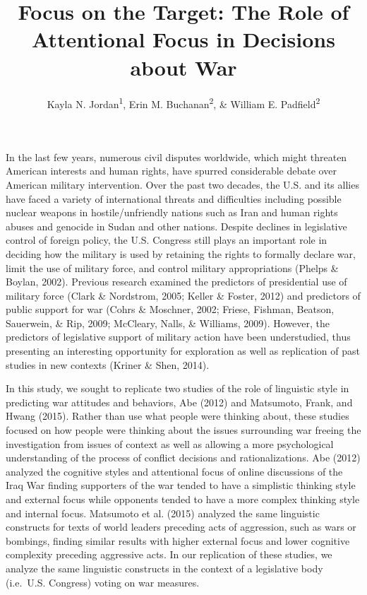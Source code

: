 \documentclass[english,,man]{apa6}
\title{Focus on the Target: The Role of Attentional Focus in Decisions about
War}
\author{Kayla N. Jordan\textsuperscript{1}, Erin M. Buchanan\textsuperscript{2},
\& William E. Padfield\textsuperscript{2}}
\date{}
\affiliation{
\vspace{0.5cm}
\textsuperscript{1} University of Texas - Austin\\\textsuperscript{2} Missouri State University}
\theoremstyle{definition}
\theoremstyle{definition}
\theoremstyle{definition}
\theoremstyle{remark}
\begin{document}
\maketitle

In the last few years, numerous civil disputes worldwide, which might
threaten American interests and human rights, have spurred considerable
debate over American military intervention. Over the past two decades,
the U.S. and its allies have faced a variety of international threats
and difficulties including possible nuclear weapons in
hostile/unfriendly nations such as Iran and human rights abuses and
genocide in Sudan and other nations. Despite declines in legislative
control of foreign policy, the U.S. Congress still plays an important
role in deciding how the military is used by retaining the rights to
formally declare war, limit the use of military force, and control
military appropriations (Phelps \& Boylan, 2002). Previous research
examined the predictors of presidential use of military force (Clark \&
Nordstrom, 2005; Keller \& Foster, 2012) and predictors of public
support for war (Cohrs \& Moschner, 2002; Friese, Fishman, Beatson,
Sauerwein, \& Rip, 2009; McCleary, Nalls, \& Williams, 2009). However,
the predictors of legislative support of military action have been
understudied, thus presenting an interesting opportunity for exploration
as well as replication of past studies in new contexts (Kriner \& Shen,
2014).

In this study, we sought to replicate two studies of the role of
linguistic style in predicting war attitudes and behaviors, Abe (2012)
and Matsumoto, Frank, and Hwang (2015). Rather than use what people were
thinking about, these studies focused on how people were thinking about
the issues surrounding war freeing the investigation from issues of
context as well as allowing a more psychological understanding of the
process of conflict decisions and rationalizations. Abe (2012) analyzed
the cognitive styles and attentional focus of online discussions of the
Iraq War finding supporters of the war tended to have a simplistic
thinking style and external focus while opponents tended to have a more
complex thinking style and internal focus. Matsumoto et al. (2015)
analyzed the same linguistic constructs for texts of world leaders
preceding acts of aggression, such as wars or bombings, finding similar
results with higher external focus and lower cognitive complexity
preceding aggressive acts. In our replication of these studies, we
analyze the same linguistic constructs in the context of a legislative
body (i.e.~U.S. Congress) voting on war measures.
\end{document}
